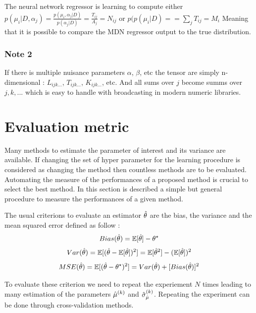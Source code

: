 The neural network regressor is learning to compute either $p(\mu_i |D, \alpha_j) = \frac{p(\mu_i, \alpha_j | D)}{p(\alpha_j | D)} = \frac{T_{ij}}{A_j} = N_{ij}$ or $p(p(\mu_i |D) = = \sum_j T_{ij} = M_i$
Meaning that it is possible to compare the MDN regressor output to the true distribution.


\subsubsection{Note 2}

If there is multiple nuisance parameters $\alpha$, $\beta$, etc the tensor are simply n-dimensional : $L_{ijk...}$, $T_{ijk...}$, $K_{ijk...}$, etc.
And all sums over $j$ become summs over $j,k, ...$ which is easy to handle with broadcasting in modern numeric libraries.



\section{Evaluation metric} %
\label{sec:evaluation_metric}


Many methods to estimate the parameter of interest and its variance are available.
If changing the set of hyper parameter for the learning procedure is considered as changing the method then countless methods are to be evaluated.
Automating the measure of the performances of a proposed method is crucial to select the best method.
In this section is described a simple but general procedure to measure the performances of a given method.

The usual criterions to evaluate an estimator $\hat\theta$ are the bias, the variance and the mean squared error defined as follow :
\begin{equation}
  Bias(\hat\theta) = \mathbb{E}[\hat\theta] - \theta^\star
\end{equation}
\begin{equation}
  Var(\hat\theta) = \mathbb{E}[ (\hat\theta - \mathbb{E}[\hat\theta])^2 ] = \mathbb{E}[\hat\theta^2] - (\mathbb{E}[\hat\theta])^2
\end{equation}
\begin{equation}
  MSE(\hat\theta) = \mathbb{E}[(\hat\theta - \theta^\star)^2] = Var(\hat\theta) + [Bias(\hat\theta)]^2
\end{equation}

To evaluate these criterion we need to repeat the experiement $N$ times leading to many estimation of the parameters $\hat\mu^{(k)}$ and $\hat\sigma_{\hat\mu}^{(k)}$.
Repeating the experiment can be done through cross-validation methods.


